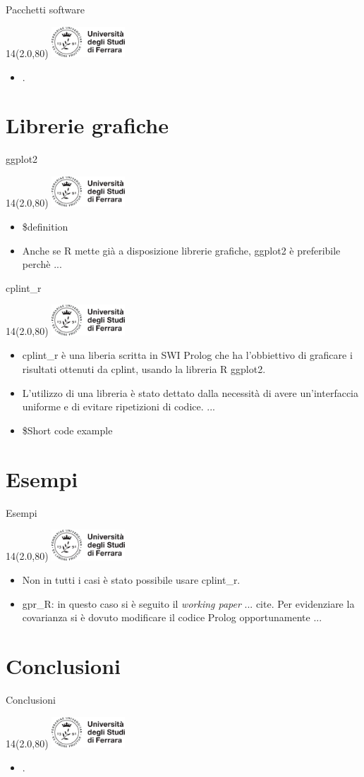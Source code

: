 \documentclass[11pt,xcolor={dvipsnames},default]{beamer} %
\newcommand{\MyLogo}{%
\begin{textblock}{14}(2.0,80)
 \includegraphics[height=1.15cm, angle=0]{logo}
\end{textblock}
}
\begin{document}
\begin{frame}{Pacchetti software}
\transboxin
\MyLogo
\begin{itemize}
\item .
\end{itemize}
\end{frame}

\section{Librerie grafiche}
\begin{frame}{ggplot2}
\transboxin
\MyLogo
\begin{itemize}
\item \$definition
\item Anche se R mette già a disposizione librerie grafiche, ggplot2 è 
preferibile perchè ...
\end{itemize}
\end{frame}

\begin{frame}{cplint\_r}
\transboxin
\MyLogo
\begin{itemize}
\item cplint\_r è una liberia scritta in SWI Prolog che ha l'obbiettivo di 
graficare i risultati ottenuti da cplint, usando la libreria R ggplot2.
\item L'utilizzo di una libreria è stato dettato dalla necessità di avere 
un'interfaccia uniforme e di evitare ripetizioni di codice. ...
\item \$Short code example
\end{itemize}
\end{frame}

\section{Esempi}
\begin{frame}{Esempi}
\transboxin
\MyLogo
\begin{itemize}
\item Non in tutti i casi è stato possibile usare cplint\_r.
\item gpr\_R: in questo caso si è seguito il \emph{working paper} ... cite. Per 
evidenziare la covarianza si è dovuto modificare il codice Prolog 
opportunamente ...
\end{itemize}
\end{frame}

\section{Conclusioni}
\begin{frame}{Conclusioni}
\transboxin
\MyLogo
\begin{itemize}
\item .
\end{itemize}
\end{frame}
\end{document}
